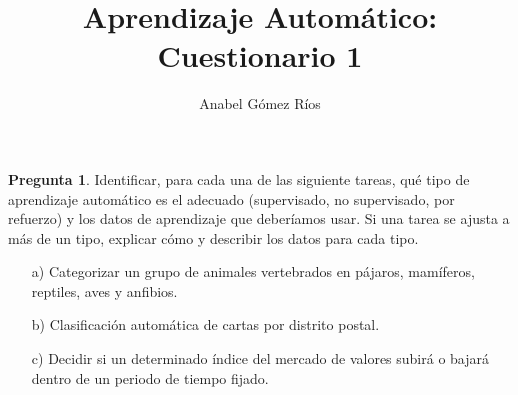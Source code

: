 \documentclass[12pt]{article}
\title{Aprendizaje Automático: Cuestionario 1}
\author{Anabel G\'omez R\'ios}
\theoremstyle{definition}
\begin{document}
\maketitle

\newtheorem{pregunta}{Pregunta}

\begin{pregunta}
Identificar, para cada una de las siguiente tareas, qué tipo de aprendizaje automático es el adecuado (supervisado, no supervisado, por refuerzo) y los datos de aprendizaje que deberíamos usar. Si una tarea se ajusta a más de un tipo, explicar cómo y describir los datos para cada tipo.
\begin{enumerate}
\item[a)] Categorizar un grupo de animales vertebrados en pájaros, mamíferos, reptiles, aves y anfibios.
\item[b)] Clasificación automática de cartas por distrito postal.
\item[c)] Decidir si un determinado índice del mercado de valores subirá o bajará dentro de un periodo de tiempo fijado.
\end{enumerate}
\textit{ }\\



\end{pregunta}
\end{document}
